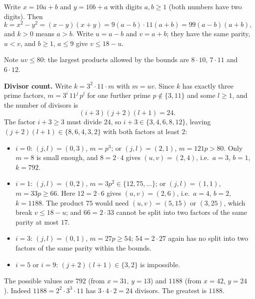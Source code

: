 Write $x=10a+b$ and $y=10b+a$ with digits $a,b\ge1$ (both numbers have two digits). Then
\[
k=x^2-y^2=(x-y)(x+y)=9(a-b)\cdot11(a+b)=99(a-b)(a+b),
\]
and $k>0$ means $a>b$. Write $u=a-b$ and $v=a+b$; they have the same parity, $u<v$, and $b\ge1$, $a\le9$ give $v\le18-u$.

Note $uv\le80$: the largest products allowed by the bounds are $8\cdot10$, $7\cdot11$ and $6\cdot12$.

\textbf{Divisor count.} Write $k=3^2\cdot11\cdot m$ with $m=uv$. Since $k$ has exactly three prime factors, $m=3^i\,11^j\,p^l$ for one further prime $p\notin\{3,11\}$ and some $l\ge1$, and the number of divisors is
\[
(i+3)(j+2)(l+1)=24 .
\]
The factor $i+3\ge3$ must divide $24$, so $i+3\in\{3,4,6,8,12\}$, leaving $(j+2)(l+1)\in\{8,6,4,3,2\}$ with both factors at least $2$:
\begin{itemize}
\item $i=0$: $(j,l)=(0,3)$, $m=p^3$; or $(j,l)=(2,1)$, $m=121p>80$. Only $m=8$ is small enough, and $8=2\cdot4$ gives $(u,v)=(2,4)$, i.e.\ $a=3$, $b=1$, $k=792$.
\item $i=1$: $(j,l)=(0,2)$, $m=3p^2\in\{12,75,\dots\}$; or $(j,l)=(1,1)$, $m=33p\ge66$. Here $12=2\cdot6$ gives $(u,v)=(2,6)$, i.e.\ $a=4$, $b=2$, $k=1188$. The product $75$ would need $(u,v)=(5,15)$ or $(3,25)$, which break $v\le18-u$; and $66=2\cdot33$ cannot be split into two factors of the same parity at most $17$.
\item $i=3$: $(j,l)=(0,1)$, $m=27p\ge54$; $54=2\cdot27$ again has no split into two factors of the same parity within the bounds.
\item $i=5$ or $i=9$: $(j+2)(l+1)\in\{3,2\}$ is impossible.
\end{itemize}
The possible values are $792$ (from $x=31$, $y=13$) and $1188$ (from $x=42$, $y=24$). Indeed $1188=2^2\cdot3^3\cdot11$ has $3\cdot4\cdot2=24$ divisors. The greatest is $\boxed{1188}$.
